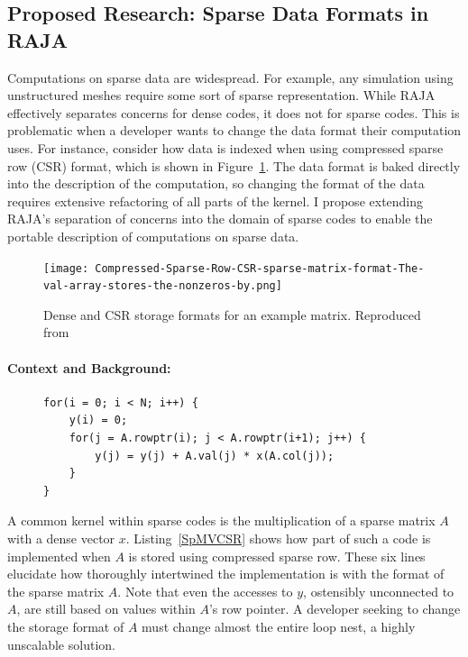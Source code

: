\documentclass{article}
\begin{document}
\subsection{Proposed Research: Sparse Data Formats in RAJA}
\label{Sec:Work3}
Computations on sparse data are widespread. 
For example, any simulation using unstructured meshes require some sort of sparse representation.
While RAJA effectively separates concerns for dense codes, it does not for sparse codes.
This is problematic when a developer wants to change the data format their computation uses.
For instance, consider how data is indexed when using compressed sparse row (CSR) format, which is shown in Figure~\ref{csr}. 
The data format is baked directly into the description of the computation, so changing the format of the data requires extensive refactoring of all parts of the kernel.
I propose extending RAJA's separation of concerns into the domain of sparse codes to enable the portable description of computations on sparse data.

\begin{figure}
\texttt{[image: Compressed-Sparse-Row-CSR-sparse-matrix-format-The-val-array-stores-the-nonzeros-by.png]}
\caption{Dense and CSR storage formats for an example matrix. Reproduced from~\cite{mohammadi2018sparse}}
\label{csr}
\end{figure}
\paragraph{Context and Background:}
\begin{figure}

\begin{lstlisting}[caption={CSR-stored sparse matrix vector multiplication},label={SpMVCSR}]
for(i = 0; i < N; i++) {
    y(i) = 0;
    for(j = A.rowptr(i); j < A.rowptr(i+1); j++) {
        y(j) = y(j) + A.val(j) * x(A.col(j));
    }
}
\end{lstlisting}
\end{figure}

A common kernel within sparse codes is the multiplication of a sparse matrix $A$ with a dense vector $x$.
Listing~\ref{SpMVCSR} shows how part of such a code is implemented when $A$ is stored using compressed sparse row.
These six lines elucidate how thoroughly intertwined the implementation is with the format of the sparse matrix $A$.
Note that even the accesses to $y$, ostensibly unconnected to $A$, are still based on values within $A$'s row pointer.
A developer seeking to change the storage format of $A$ must change almost the entire loop nest, a highly unscalable solution.
\end{document}
